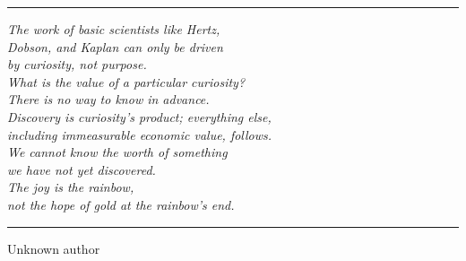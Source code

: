 \clearpage

\thispagestyle{empty}
\null\vfill

\begin{center}
\parbox{9cm}{%
  \rule[1em]{9cm}{0.5pt}
  \raggedright{\normalsize \textit{%
  The work of basic scientists like Hertz, \\
  Dobson, and Kaplan can only be driven \\
  by curiosity, not purpose. \\
  What is the value of a particular curiosity? \\
  There is no way to know in advance. \\
  Discovery is curiosity’s product; everything else, \\
  including immeasurable economic value, follows. \\
  We cannot know the worth of something \\
  we have not yet discovered. \\
  The joy is the rainbow, \\
  not the hope of gold at the rainbow’s end.}\par\bigskip
  }   
  \rule[1em]{9cm}{0.5pt}
  \raggedleft\small Unknown author\par%
}
\vfill\vfill
\end{center}
\clearpage